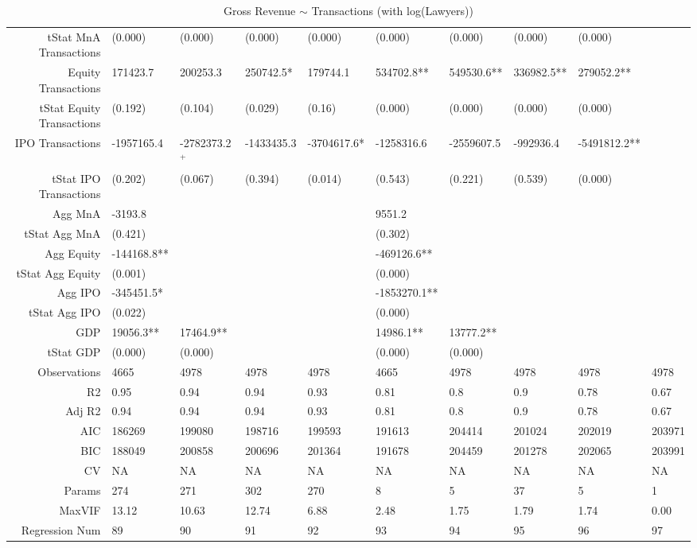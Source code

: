 \begin{table}[ht]
\begin{tabular}{rlllllllll}
  tStat MnA Transactions & (0.000) & (0.000) & (0.000) & (0.000) & (0.000) & (0.000) & (0.000) & (0.000) &  \\ 
  Equity Transactions & 171423.7 & 200253.3 & 250742.5* & 179744.1 & 534702.8** & 549530.6** & 336982.5** & 279052.2** &  \\ 
  tStat Equity Transactions & (0.192) & (0.104) & (0.029) & (0.16) & (0.000) & (0.000) & (0.000) & (0.000) &  \\ 
  IPO Transactions & -1957165.4 & -2782373.2$^{+}$ & -1433435.3 & -3704617.6* & -1258316.6 & -2559607.5 & -992936.4 & -5491812.2** &  \\ 
  tStat IPO Transactions & (0.202) & (0.067) & (0.394) & (0.014) & (0.543) & (0.221) & (0.539) & (0.000) &  \\ 
  Agg MnA & -3193.8 &  &  &  & 9551.2 &  &  &  &  \\ 
  tStat Agg MnA & (0.421) &  &  &  & (0.302) &  &  &  &  \\ 
  Agg Equity & -144168.8** &  &  &  & -469126.6** &  &  &  &  \\ 
  tStat Agg Equity & (0.001) &  &  &  & (0.000) &  &  &  &  \\ 
  Agg IPO & -345451.5* &  &  &  & -1853270.1** &  &  &  &  \\ 
  tStat Agg IPO & (0.022) &  &  &  & (0.000) &  &  &  &  \\ 
  GDP & 19056.3** & 17464.9** &  &  & 14986.1** & 13777.2** &  &  &  \\ 
  tStat GDP & (0.000) & (0.000) &  &  & (0.000) & (0.000) &  &  &  \\ 
  Observations & 4665 & 4978 & 4978 & 4978 & 4665 & 4978 & 4978 & 4978 & 4978 \\ 
  R2 & 0.95 & 0.94 & 0.94 & 0.93 & 0.81 & 0.8 & 0.9 & 0.78 & 0.67 \\ 
  Adj R2 & 0.94 & 0.94 & 0.94 & 0.93 & 0.81 & 0.8 & 0.9 & 0.78 & 0.67 \\ 
  AIC & 186269 & 199080 & 198716 & 199593 & 191613 & 204414 & 201024 & 202019 & 203971 \\ 
  BIC & 188049 & 200858 & 200696 & 201364 & 191678 & 204459 & 201278 & 202065 & 203991 \\ 
  CV & NA & NA & NA & NA & NA & NA & NA & NA & NA \\ 
  Params & 274 & 271 & 302 & 270 & 8 & 5 & 37 & 5 & 1 \\ 
  MaxVIF & 13.12 & 10.63 & 12.74 & 6.88 & 2.48 & 1.75 & 1.79 & 1.74 & 0.00 \\ 
  Regression Num & 89 & 90 & 91 & 92 & 93 & 94 & 95 & 96 & 97 \\ 
   \hline
\end{tabular}
\caption{Gross Revenue $\sim$ Transactions (with log(Lawyers))} 
\end{table}
